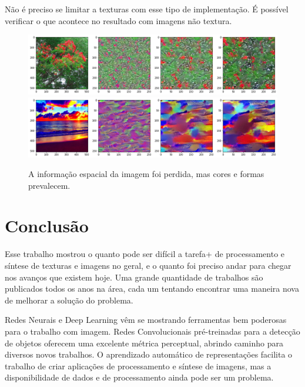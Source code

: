 
Não é preciso se limitar a texturas com
esse tipo de implementação. É possível verificar
o que acontece no resultado com imagens não textura.

\begin{figure}[!ht]
	\centering
	\includegraphics[width=\linewidth]{files/assets/results/result7.png}
	\includegraphics[width=\linewidth]{files/assets/results/result8.png}
	\caption{A informação espacial da imagem foi perdida,
	mas cores e formas prevalecem.}
	\label{img:preview}
\end{figure}




\chapter{Conclusão}

Esse trabalho mostrou o quanto
pode ser difícil a tarefa+ de
processamento e síntese
de texturas e imagens no geral,
e o quanto foi preciso andar
para chegar nos avanços que
existem hoje.
Uma grande quantidade de trabalhos
são publicados todos os anos
na área, cada um tentando
encontrar uma maneira nova de
melhorar a solução do problema.

Redes Neurais e Deep Learning
vêm se mostrando ferramentas
bem poderosas para o trabalho com imagem.
Redes Convolucionais pré-treinadas
para a detecção de objetos
oferecem uma excelente métrica
perceptual, abrindo caminho para
diversos novos trabalhos.
O aprendizado automático
de representações facilita
o trabalho de criar aplicações
de processamento e síntese de imagens,
mas a disponibilidade de dados
e de processamento ainda pode ser
um problema.

